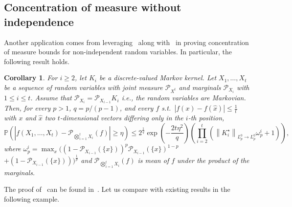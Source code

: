 \documentclass[11pt]{article}
\newcommand{\Pm}{\mathcal{P}}
\theoremstyle{plain}
\newtheorem{corollary}{Corollary}[section]
\theoremstyle{remark}
\begin{document}
\subsection{Concentration of measure without independence}\label{sec:concentration}
Another application comes from leveraging~ along with~ in proving concentration of measure bounds for non-independent random variables. %
In particular, the following result holds.
\begin{corollary}\label{thm:sdpiConcentrationBound}
     For $i\geq 2$, let $K_i$ be a discrete-valued Markov kernel. Let $X_1,\ldots,X_t$  be a sequence of random variables with joint measure $\Pm_{X^t}$ and marginals $\Pm_{X_i}$ with $1\leq i \leq t$. Assume that $\Pm_{X_i} = \Pm_{X_{i-1}}K_{i}$ \textit{i.e.}, the random variables are Markovian. Then, for every $p>1$, $q=p/(p-1)$, and every $f$ s.t.\ $|f(x)-f(\hat{x})|\leq \frac1t$ with $x$ and $\hat{x}$ two $t$-dimensional vectors differing only in the $i$-th position,
        \begin{equation}
               \mathbb{P}\left(\left\lvert f(X_1,\ldots,X_t)-\Pm_{\bigotimes_{i=1}^t X_i}(f)\right\rvert \geq \eta \right) \leq 2^\frac1q \exp\left(-\frac{2t\eta^2}{q}\right)\left(\prod_{i=2}^t \left(\left\lVert K_i^\star \right\rVert_{L_p^0\to L_p^0}\omega_p^i+1\right)\right),\label{eq:concentrationSDPI}
        \end{equation}
   where $\omega_p^i = \max_{x} 
((1-\Pm_{X_{i-1}}(\{x\}))^p \Pm_{X_{i-1}}(\{x\})^{1-p}$ $+ (1-\Pm_{X_{i-1}}(\{x\})) )^\frac1p$ and $\Pm_{\bigotimes_{i=1}^t X_i}(f)$ is mean of $f$ under the product of the marginals.  
\end{corollary}
The proof of~ can be found in~. 
Let us compare with existing results in the following example. 
\end{document}
